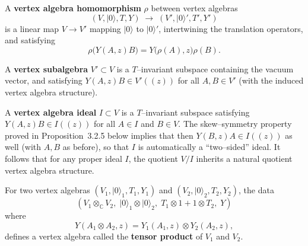 \documentclass[12pt]{article}
\begin{document}
\begin{definition}
A \textbf{vertex algebra homomorphism} $\rho$ between vertex algebras
\[
(V, \lvert 0 \rangle, T, Y) \;\longrightarrow\; (V', \lvert 0 \rangle', T', Y')
\]
is a linear map $V \to V'$ mapping $\lvert 0 \rangle$ to $\lvert 0 \rangle'$, 
intertwining the translation operators, and satisfying
\[
\rho\big(Y(A,z)B\big) = Y\big(\rho(A),z\big)\rho(B).
\]

A \textbf{vertex subalgebra} $V' \subset V$ is a $T$–invariant subspace 
containing the vacuum vector, and satisfying 
$Y(A,z)B \in V'((z))$ for all $A,B \in V'$ 
(with the induced vertex algebra structure).

A \textbf{vertex algebra ideal} $I \subset V$ is a $T$–invariant subspace satisfying 
$Y(A,z)B \in I((z))$ for all $A \in I$ and $B \in V$.  
The skew–symmetry property proved in Proposition~3.2.5 below implies that then 
$Y(B,z)A \in I((z))$ as well (with $A,B$ as before), so that $I$ is automatically 
a ``two–sided'' ideal.  
It follows that for any proper ideal $I$, the quotient $V/I$ inherits 
a natural quotient vertex algebra structure.
\end{definition}
\begin{definition}
For two vertex algebras $(V_1, \lvert 0 \rangle_1, T_1, Y_1)$ 
and $(V_2, \lvert 0 \rangle_2, T_2, Y_2)$, 
the data
\[
(V_1 \otimes_{\mathbb{C}} V_2,\;
 \lvert 0 \rangle_1 \otimes \lvert 0 \rangle_2,\;
 T_1 \otimes 1 + 1 \otimes T_2,\;
 Y)
\]
where
\[
Y(A_1 \otimes A_2, z) 
= Y_1(A_1,z) \otimes Y_2(A_2,z),
\]
defines a vertex algebra called the \textbf{tensor product} 
of $V_1$ and $V_2$.
\end{definition}
\end{document}
